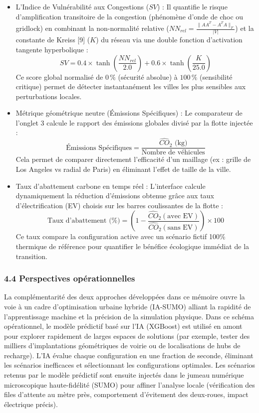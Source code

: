 \documentclass[10pt, a4paper]{article}
\begin{document}
\begin{itemize}
\item
  L'Indice de Vulnérabilité aux Congestions (\(SV\)) : Il quantifie le
  risque d'amplification transitoire de la congestion (phénomène d'onde
  de choc ou gridlock) en combinant la non-normalité relative
  (\(NN_{rel} = \frac{\|AA^T - A^TA\|_F}{|V|}\)) et la constante de
  Kreiss {[}9{]} (\(K\)) du réseau via une double fonction d'activation
  tangente hyperbolique :
  \[SV = 0.4 \times \tanh\left(\frac{NN_{rel}}{2.0}\right) + 0.6 \times \tanh\left(\frac{K}{25.0}\right)\]
  Ce score global normalisé de \(0\,\%\) (sécurité absolue) à
  \(100\,\%\) (sensibilité critique) permet de détecter instantanément
  les villes les plus sensibles aux perturbations locales.
\item
  Métrique géométrique neutre (Émissions Spécifiques) : Le comparateur
  de l'onglet 3 calcule le rapport des émissions globales divisé par la
  flotte injectée :
  \[\text{Émissions Spécifiques} = \frac{\widehat{CO}_2 \text{ (kg)}}{\text{Nombre de véhicules}}\]
  Cela permet de comparer directement l'efficacité d'un maillage (ex :
  grille de Los Angeles vs radial de Paris) en éliminant l'effet de
  taille de la ville.
\item
  Taux d'abattement carbone en temps réel : L'interface calcule
  dynamiquement la réduction d'émissions obtenue grâce aux taux
  d'électrification (EV) choisis sur les barres coulissantes de la
  flotte :
  \[\text{Taux d'abattement (\%)} = \left( 1 - \frac{\widehat{CO}_2(\text{avec EV})}{\widehat{CO}_2(\text{sans EV})} \right) \times 100\]
  Ce taux compare la configuration active avec un scénario fictif 100\%
  thermique de référence pour quantifier le bénéfice écologique immédiat
  de la transition.
\end{itemize}

\subsubsection{4.4 Perspectives
opérationnelles}\label{perspectives-opuxe9rationnelles}

La complémentarité des deux approches développées dans ce mémoire ouvre
la voie à un cadre d'optimisation urbaine hybride (IA-SUMO) alliant la
rapidité de l'apprentissage machine et la précision de la simulation
physique. Dans ce schéma opérationnel, le modèle prédictif basé sur l'IA
(XGBoost) est utilisé en amont pour explorer rapidement de larges
espaces de solutions (par exemple, tester des milliers d'implantations
géométriques de voirie ou de localisations de hubs de recharge). L'IA
évalue chaque configuration en une fraction de seconde, éliminant les
scénarios inefficaces et sélectionnant les configurations optimales. Les
scénarios retenus par le modèle prédictif sont ensuite injectés dans le
jumeau numérique microscopique haute-fidélité (SUMO) pour affiner
l'analyse locale (vérification des files d'attente au mètre près,
comportement d'évitement des deux-roues, impact électrique précis).
\end{document}
